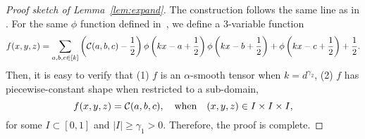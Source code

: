\documentclass[11pt]{article}
\theoremstyle{definition}
\begin{document}
\begin{proof}[Proof sketch of Lemma~\ref{lem:expand}]
The construction follows the same line as in \citet[Supplement, page 3]{gao2015rate}. For the same $\phi$ function defined in~\cite{gao2015rate}, we define a 3-variable function
\[
f(x,y,z)=\sum_{a,b,c\in[k]}\left(\mathcal{C}(a,b,c)-{1\over 2}\right)\phi\left(kx-a+{1\over 2}\right)\phi\left(kx-b+{1\over 2}\right)+\phi\left(kx-c+{1\over 2}\right)+{1\over 2}.
\]
Then, it is easy to verify that (1) $f$ is an $\alpha$-smooth tensor when $k=d^{\gamma_2}$, (2) $f$ has piecewise-constant shape when restricted to a sub-domain,
\[
f(x,y,z)=\mathcal{C}(a,b,c),\quad \text{when}\quad (x,y,z)\in I\times I\times I,
\]
for some $I\subset[0,1]$ and $|I|\geq \gamma_1>0$. Therefore, the proof is complete. 
\end{proof}


\end{document}
